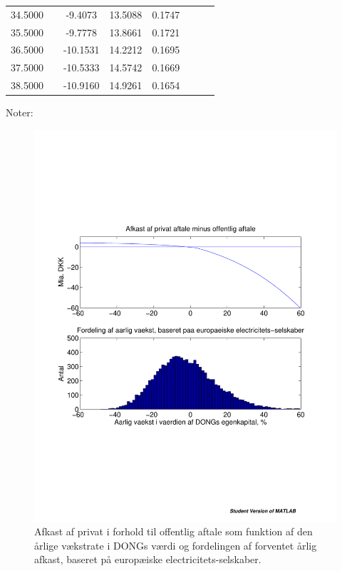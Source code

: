 \documentclass{article}
\begin{document}
\begin{table}[h]
\begin{tabularx}{0.95\linewidth}{cXcccccr}
34.5000&&-9.4073&13.5088& 0.1747\\
35.5000&&-9.7778&13.8661& 0.1721\\
36.5000&&-10.1531&14.2212& 0.1695\\
37.5000&&-10.5333&14.5742& 0.1669\\
38.5000&&-10.9160&14.9261& 0.1654\\
		\bottomrule[1pt]
	\end{tabularx}
	\begin{minipage}{\linewidth}
		\footnotesize{Noter: }
	\end{minipage}
\end{table}


\begin{figure}
\includegraphics[scale=0.8]{../matlab/figs/afkast_hist_combine_elec}
\caption{Afkast af privat i forhold til offentlig aftale som funktion af den årlige v\ae{}kstrate i DONGs v\ae{}rdi og fordelingen af forventet \aa{}rlig afkast, baseret p\aa{} europ\ae{}iske electricitets-selskaber.}
\label{fig:combine1}
\end{figure}
\end{document}
